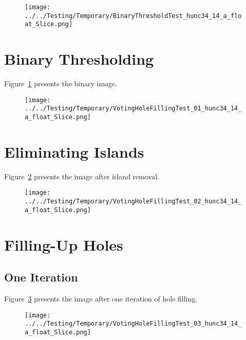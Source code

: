 \documentclass{InsightArticle}
\begin{document}
\clearpage
\begin{figure}
\center
\texttt{[image: ../../Testing/Temporary/BinaryThresholdTest\_hunc34\_14\_a\_float\_Slice.png]}
\label{fig:BinaryImage2}
\end{figure}

\section{Binary Thresholding}

Figure~\ref{fig:BinaryImage2} presents the binary image.


\clearpage
\begin{figure}
\center
\texttt{[image: ../../Testing/Temporary/VotingHoleFillingTest\_01\_hunc34\_14\_a\_float\_Slice.png]}
\label{fig:IslandRemovalImage2}
\end{figure}

\section{Eliminating Islands}

Figure~\ref{fig:IslandRemovalImage2} presents the image after island removal.


\clearpage
\begin{figure}
\center
\texttt{[image: ../../Testing/Temporary/VotingHoleFillingTest\_02\_hunc34\_14\_a\_float\_Slice.png]}
\label{fig:HoleFillingIteration01Image2}
\end{figure}

\section{Filling-Up Holes}

\subsection{One Iteration}

Figure~\ref{fig:HoleFillingIteration01Image2} presents the image after one iteration of hole filling.



\clearpage
\begin{figure}
\center
\texttt{[image: ../../Testing/Temporary/VotingHoleFillingTest\_03\_hunc34\_14\_a\_float\_Slice.png]}
\label{fig:HoleFillingIteration02Image2}
\end{figure}
\end{document}
